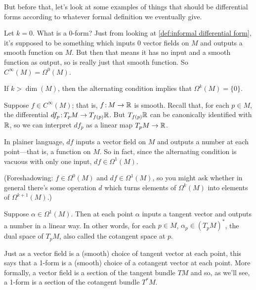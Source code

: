 But before that, let's look at some examples of things that should be differential forms according to whatever formal definition we eventually give.

\begin{example}\label{ex:0-forms and functions}
	Let $k=0$. What is a $0$-form? Just from looking at \cref{def:informal differential form}, it's supposed to be something which inputs 0 vector fields on $M$ and outputs a smooth function on $M$. But then that means it has no input and a smooth function as output, so is really just that smooth function. So $C^\infty(M) = \Omega^0(M)$.
\end{example}

\begin{example}\label{ex:k-forms with k>n}
	If $k > \dim(M)$, then the alternating condition implies that $\Omega^k(M) = \{0\}$.
\end{example}

\begin{example}\label{ex:differentials as 1-forms}
	Suppose $f \in C^\infty(M)$; that is, $f\colon\thinspace\!\! M \to \mathbb{R}$ is smooth. Recall that, for each $p \in M$, the differential $df_p\colon\thinspace\!\! T_p M \to T_{f(p)}\mathbb{R}$. But $T_{f(p)}\mathbb{R}$ can be canonically identified with $\mathbb{R}$, so we can interpret $df_p$ as a linear map $T_pM \to \mathbb{R}$. 
	
	In plainer language, $df$ inputs a vector field on $M$ and outputs a number at each point---that is, a function on $M$. So in fact, since the alternating condition is vacuous with only one input, $df \in \Omega^1(M)$.
	
	(Foreshadowing: $f \in \Omega^0(M)$ and $df \in \Omega^1(M)$, so you might ask whether in general there's some operation $d$ which turns elements of $\Omega^k(M)$ into elements of $\Omega^{k+1}(M)$.)
\end{example}

\begin{example}\label{ex:1-forms as covectors}
	Suppose $\alpha\in \Omega^1(M)$. Then at each point $\alpha$ inputs a tangent vector and outputs a number in a linear way. In other words, for each $p \in M$, $\alpha_p \in \left(T_pM\right)^\ast$, the dual space of $T_pM$, also called the cotangent space at $p$.
	
	Just as a vector field is a (smooth) choice of tangent vector at each point, this says that a 1-form is a (smooth) choice of a cotangent vector at each point. More formally, a vector field is a section of the tangent bundle $TM$ and so, as we'll see, a 1-form is a section of the cotangent bundle $T^\ast M$.
\end{example}

